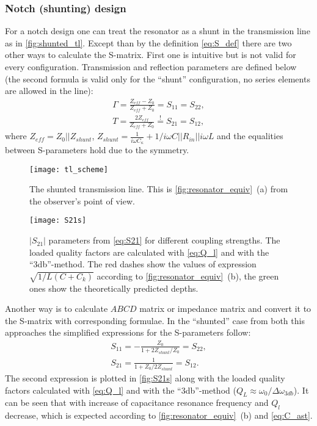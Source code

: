 \documentclass[12pt, twoside]{report}
\numberwithin{equation}{section}
\begin{document}
\subsubsection{Notch (shunting) design}
For a notch design one can treat the resonator as a shunt in the transmission line as in \autoref{fig:shunted_tl}. Except than by the definition \eqref{eq:S_def} there are two other ways to calculate the S-matrix. First one is intuitive but is not valid for every configuration. Transmission and reflection parameters are defined\cite{Kiselev2013} below (the second formula is valid only for the ``shunt'' configuration, no series elements are allowed in the line):
\begin{gather}    
\Gamma = \frac{Z_{eff} - Z_{0}}{Z_{eff} + Z_{0}} = S_{11} = S_{22}, \label{eGamma}\\
T = \frac{2Z_{eff}}{Z_{eff}+Z_0} \overset{!}{=} S_{21} = S_{12}, \label{eT}
\end{gather}
where $Z_{eff} = Z_0 || Z_{shunt}$, $Z_{shunt} = \frac{1}{i\omega C_\kappa} + 1/i\omega C||R_{in}||i\omega L$ and the equalities between S-parameters hold due to the symmetry.
\begin{figure}[h]
\centering
\texttt{[image: tl\_scheme]}
\caption{The shunted transmission line. This is \autoref{fig:resonator_equiv}~(a)  from the observer's point of view.}
\label{fig:shunted_tl}
\end{figure}
\begin{figure}[h]
\centering
\texttt{[image: S21s]}
\caption{ $|S_{21}|$ parameters from \eqref{eq:S21} for different coupling strengths. The loaded quality factors are calculated with \eqref{eq:Q_l} and with the ``3db''-method. The red dashes show the values of expression $\sqrt{1/L(C+C_k)}$ according to \autoref{fig:resonator_equiv}~(b), the green ones show the theoretically predicted depths.}
\label{fig:S21s}
\end{figure}

Another way is to calculate $ABCD$ matrix or impedance matrix and convert it to the S-matrix with corresponding formulae\cite{pozar2012}. In the ``shunted'' case from both this approaches the simplified expressions for the S-parameters follow:
\begin{gather}
S_{11} = -\frac{Z_0}{1 + 2Z_{shunt}/Z_0} = S_{22}, \\
S_{21} = \frac{1}{1+Z_0/2Z_{shunt}} = S_{12}. \label{eq:S21}
\end{gather}
The second expression is plotted in \autoref{fig:S21s} along with the loaded quality factors calculated with \eqref{eq:Q_l} and with the ``3db''-method ($Q_L \approx \omega_0/\Delta\omega_{3db}$). It can be seen that with increase of capacitance resonance frequency and $Q_l$ decrease, which is expected according to \autoref{fig:resonator_equiv}~(b) and \eqref{eq:C_ast}.
\end{document}
